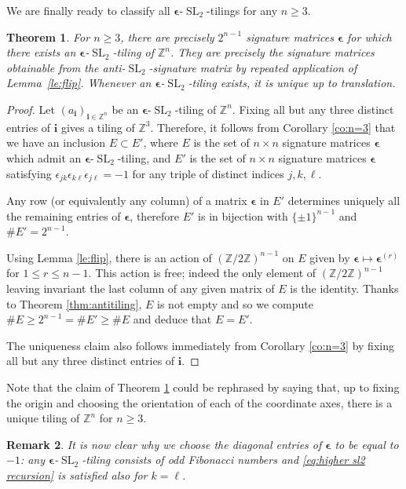 \documentclass[11pt,reqno]{amsart}
\newtheorem{theorem}{Theorem}
\newtheorem{remark}[theorem]{Remark}
\newcommand{\bepsilon}{\boldsymbol{\epsilon}}
\newcommand{\bi}{\boldsymbol{i}}
\newcommand{\SL}{\operatorname{SL}}
\newcommand{\ZZ}{\mathbb{Z}}
\begin{document}
  We are finally ready to classify all $\bepsilon$-$\SL_2$-tilings for any $n\geq3$.
  \begin{theorem}
    \label{thm:classification}
    For $n\geq3$, there are precisely $2^{n-1}$ signature matrices $\bepsilon$ for which there exists an $\bepsilon$-$\SL_2$-tiling of $\ZZ^n$.
    They are precisely the signature matrices obtainable from the anti-$\SL_2$-signature matrix by repeated application of Lemma~\ref{le:flip}.
    Whenever an $\bepsilon$-$\SL_2$-tiling exists, it is unique up to translation.
  \end{theorem}
  \begin{proof}
    Let $(a_{\bi})_{\bi\in\ZZ^n}$ be an $\bepsilon$-$\SL_2$-tiling of $\ZZ^n$. 
    Fixing all but any three distinct entries of $\bi$ gives a tiling of $\ZZ^3$.
    Therefore, it follows from Corollary \ref{co:n=3} that we have an inclusion $E \subset E'$, where $E$ is the set of $n\times n$ signature matrices $\bepsilon$ which admit an $\bepsilon$-$\SL_2$-tiling, and $E'$ is the set of $n\times n$ signature matrices $\bepsilon$ satisfying $\epsilon_{jk} \epsilon_{k\ell} \epsilon_{j\ell} = -1$ for any triple of distinct indices $j,k,\ell$.

    Any row (or equivalently any column) of a matrix $\bepsilon$ in $E'$ determines uniquely all the remaining entries of $\bepsilon$, therefore $E'$ is in bijection with $\{\pm 1\}^{n-1}$ and $\#E'= 2^{n-1}$.

    Using Lemma \ref{le:flip}, there is an action of $(\ZZ/2\ZZ)^{n-1}$ on $E$ given by $\bepsilon \mapsto \bepsilon^{(r)}$ for $1 \leq r \leq n-1$. 
    This action is free; indeed the only element of $(\ZZ/2\ZZ)^{n-1}$ leaving invariant the last column of any given matrix of $E$ is the identity. 
    Thanks to Theorem \ref{thm:antitiling}, $E$ is not empty and so we compute $\#E \geq 2^{n-1} = \# E' \geq \#E$ and deduce that $E = E'$.

    The uniqueness claim also follows immediately from Corollary \ref{co:n=3} by fixing all but any three distinct entries of $\bi$.

  \end{proof}

  Note that the claim of Theorem \ref{thm:classification} could be rephrased by saying that, up to fixing the origin and choosing the orientation of each of the coordinate axes, there is a unique tiling of $\ZZ^n$ for $n\ge3$.
  
  \begin{remark}
    It is now clear why we choose the diagonal entries of $\bepsilon$ to be equal to $-1$: any $\bepsilon$-$\SL_2$-tiling consists of odd Fibonacci numbers and \eqref{eq:higher sl2 recursion} is satisfied also for $k=\ell$.
  \end{remark} 
\end{document}
